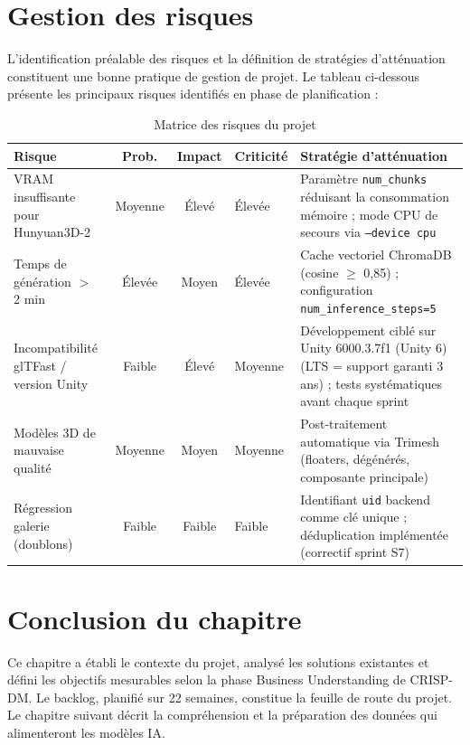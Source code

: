 \documentclass[12pt,a4paper,oneside]{report}
\newcommand{\theadrow}{\rowcolor{tekupblue!12}}
\begin{document}
\section{Gestion des risques}
\label{sec:risques}

L'identification préalable des risques et la définition de stratégies
d'atténuation constituent une bonne pratique de gestion de projet.
Le tableau ci-dessous présente les principaux risques identifiés en
phase de planification :

\begin{table}[H]
\centering
\caption{Matrice des risques du projet}
\label{tab:risques}
\begin{tabularx}{\linewidth}{@{}p{3.2cm}ccp{1.5cm}X@{}}
\toprule
\theadrow
\textbf{Risque} & \textbf{Prob.} & \textbf{Impact} & \textbf{Criticité} & \textbf{Stratégie d'atténuation} \\\midrule
VRAM insuffisante pour Hunyuan3D-2
  & Moyenne & Élevé & Élevée
  & Paramètre \texttt{num\_chunks} réduisant la consommation mémoire ;
    mode CPU de secours via \texttt{--device cpu} \\[4pt]
Temps de génération $>$ 2 min
  & Élevée & Moyen & Élevée
  & Cache vectoriel ChromaDB (cosine $\geq$ 0{,}85) ;
    configuration \texttt{num\_inference\_steps=5} \\[4pt]
Incompatibilité glTFast / version Unity
  & Faible & Élevé & Moyenne
  & Développement ciblé sur Unity 6000.3.7f1 (Unity 6) (LTS = support garanti 3 ans) ;
    tests systématiques avant chaque sprint \\[4pt]
Modèles 3D de mauvaise qualité
  & Moyenne & Moyen & Moyenne
  & Post-traitement automatique via Trimesh~\cite{trimesh} (floaters, dégénérés,
    composante principale) \\[4pt]
Régression galerie (doublons)
  & Faible & Faible & Faible
  & Identifiant \texttt{uid} backend comme clé unique ;
    déduplication implémentée (correctif sprint S7) \\
\bottomrule
\end{tabularx}
\end{table}

\section*{Conclusion du chapitre}

Ce chapitre a établi le contexte du projet, analysé les solutions existantes
et défini les objectifs mesurables selon la phase Business Understanding de
CRISP-DM. Le backlog, planifié sur 22 semaines, constitue la feuille de
route du projet. Le chapitre suivant décrit la compréhension et la préparation
des données qui alimenteront les modèles IA.
\end{document}
